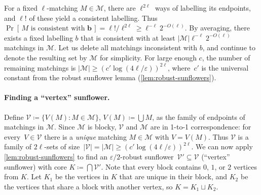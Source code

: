 \documentclass[11pt]{article}
\theoremstyle{plain}
\theoremstyle{definition}
\theoremstyle{remark}
\newcommand{\eps}{\varepsilon}
\def\calm{{\mathcal M}}
\def\calv{{\mathcal V}}
\begin{document}
For a fixed $\ell$-matching $M\in\calm$, there are $\ell^{2\ell}$ ways of labelling its endpoints, and $\ell!$ of these yield a consistent labelling. Thus $
\Pr[\,\text{$M$ is consistent with $\bm b$}\,] = \ell!/\ell^{2\ell} \geq \ell^{-\ell}2^{-O(\ell)}$. By averaging, there exists a fixed labelling $b$ that is consistent with at least $|\calm| \ell^{-\ell}2^{-O(\ell)}$ matchings in $\calm$. Let us delete all matchings inconsistent with $b$, and continue to denote the resulting set by $\calm$ for simplicity. For large enough $c$, the number of remaining matchings is $|\calm| \geq (c' \log (4\ell / \eps))^{2\ell}$, where~$c'$ is the universal constant from the robust sunflower lemma (\cref{lem:robust-sunflowers}).

\paragraph{Finding a ``vertex'' sunflower.}
Define $\calv \coloneqq \{V(M) : M \in \calm\}$, $V(M)\coloneqq \bigcup M$, as the family of endpoints of
matchings in $\calm$. Since $\calm$ is blocky, $\calv$ and $\calm$ are in 1-to-1 correspondence: for
every~$V \in \calv$ there is a \emph{unique} matching $M\in\calm$ with $V=V(M)$. Thus $\calv$ is a family
of $2\ell$-sets of size~$|\calv|=|\calm|\geq (c' \log (4\ell/\varepsilon))^{2\ell}$. We can now apply
\cref{lem:robust-sunflowers} to find an $\eps/2$-robust sunflower~$\calv'\subseteq\calv$ (``vertex''
sunflower) with core $K \coloneqq \bigcap \calv'$. Note that every block contains $0$, $1$, or $2$
vertices from $K$. Let $K_1$ be the vertices in $K$ that are unique in their block, and $K_2$ be the
vertices that share a block with another vertex, so $K = K_1 \sqcup K_2$.
\end{document}
